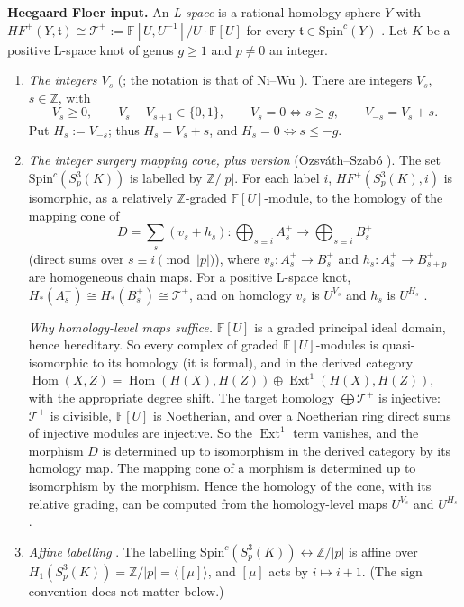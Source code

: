 \documentclass[11pt]{article}
\theoremstyle{definition}
\newcommand{\F}{\mathbb{F}}
\newcommand{\Z}{\mathbb{Z}}
\newcommand{\Tp}{\mathcal{T}^+}
\newcommand{\HFp}{\mathit{HF}^+}
\newcommand{\Spinc}{\mathrm{Spin}^c}
\begin{document}
\medskip
\noindent\textbf{Heegaard Floer input.} An \emph{L-space} is a rational homology sphere $Y$ with $\HFp(Y,\mathfrak t)\cong\Tp:=\F[U,U^{-1}]/U\cdot\F[U]$ for every $\mathfrak t\in\Spinc(Y)$ \cite{OSlens}. Let $K$ be a positive L-space knot of genus $g\ge1$ and $p\ne0$ an integer.

\begin{enumerate}[label=(H\arabic*),leftmargin=*]
\item\label{H:V} \emph{The integers $V_s$} (\cite{OSinteger,OSlens}; the notation is that of Ni--Wu \cite{NiWu}). There are integers $V_s$, $s\in\Z$, with
\[
V_s\ge0,\qquad V_s-V_{s+1}\in\{0,1\},\qquad V_s=0\iff s\ge g,\qquad V_{-s}=V_s+s.
\]
Put $H_s:=V_{-s}$; thus $H_s=V_s+s$, and $H_s=0\iff s\le -g$.

\item\label{H:cone} \emph{The integer surgery mapping cone, plus version} (Ozsv\'ath--Szab\'o \cite{OSinteger}). The set $\Spinc(S^3_p(K))$ is labelled by $\Z/|p|$. For each label $i$, $\HFp(S^3_p(K),i)$ is isomorphic, as a relatively $\Z$-graded $\F[U]$-module, to the homology of the mapping cone of
\[
D=\sum_s(v_s+h_s)\colon \bigoplus_{s\equiv i}A_s^+\longrightarrow\bigoplus_{s\equiv i}B_s^+
\]
(direct sums over $s\equiv i\pmod{|p|}$), where $v_s\colon A^+_s\to B^+_s$ and $h_s\colon A_s^+\to B^+_{s+p}$ are homogeneous chain maps. For a positive L-space knot, $H_*(A^+_s)\cong H_*(B^+_s)\cong\Tp$, and on homology $v_s$ is $U^{V_s}$ and $h_s$ is $U^{H_s}$ \cite{OSlens,OSinteger}.

\emph{Why homology-level maps suffice.} $\F[U]$ is a graded principal ideal domain, hence hereditary. So every complex of graded $\F[U]$-modules is quasi-isomorphic to its homology (it is formal), and in the derived category $\operatorname{Hom}(X,Z)=\operatorname{Hom}(H(X),H(Z))\oplus\operatorname{Ext}^1(H(X),H(Z))$, with the appropriate degree shift. The target homology $\bigoplus\Tp$ is injective: $\Tp$ is divisible, $\F[U]$ is Noetherian, and over a Noetherian ring direct sums of injective modules are injective. So the $\operatorname{Ext}^1$ term vanishes, and the morphism $D$ is determined up to isomorphism in the derived category by its homology map. The mapping cone of a morphism is determined up to isomorphism by the morphism. Hence the homology of the cone, with its relative grading, can be computed from the homology-level maps $U^{V_s}$ and $U^{H_s}$.

\item\label{H:affine} \emph{Affine labelling} \cite{OSinteger}. The labelling $\Spinc(S^3_p(K))\leftrightarrow\Z/|p|$ is affine over $H_1(S^3_p(K))=\Z/|p|=\langle[\mu]\rangle$, and $[\mu]$ acts by $i\mapsto i+1$. (The sign convention does not matter below.)


\end{enumerate}
\end{document}
